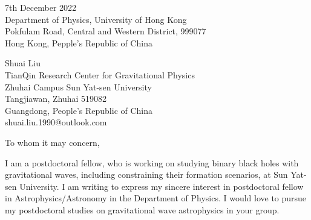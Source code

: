 \documentclass[11pt,a4paper,sans]{letter} %
\date{}
\begin{document}

\begin{letter}{7th December 2022 \\
Department of Physics, University of Hong Kong\\
Pokfulam Road, Central and Western District, 999077\\ 
Hong Kong, Pepple's Republic of China}

Shuai Liu \\
TianQin Research Center for Gravitational Physics \\
Zhuhai Campus Sun Yat-sen University \\
Tangjiawan, Zhuhai 519082 \\
Guangdong, People's Republic of China \\
shuai.liu.1990@outlook.com








\opening{To whom it may concern,}
I am a postdoctoral fellow, who is working on studying binary black holes with gravitational waves, including constraining their formation scenarios, at Sun Yat-sen University.
I am writing to express my sincere interest in postdoctoral fellow in Astrophysics/Astronomy in the Department of Physics. I would love to
pursue my postdoctoral studies on gravitational wave astrophysics in your group. 


\end{letter}
\end{document}
